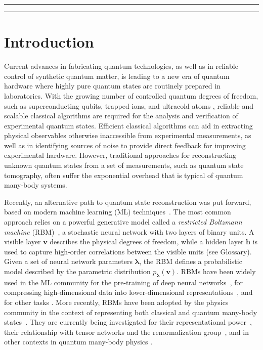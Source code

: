 \documentclass[submission, Phys, hidelnks]{SciPost}
\begin{document}
\vspace{10pt}
\noindent\rule{\textwidth}{1pt}
\tableofcontents\thispagestyle{fancy}
\noindent\rule{\textwidth}{1pt}
\vspace{10pt}

\section{Introduction}
Current advances in fabricating quantum technologies, as well as in reliable control of synthetic quantum matter, is leading to a new era of quantum 
hardware where highly pure quantum states are routinely prepared in laboratories. 
With the growing number of controlled quantum degrees of freedom, such as superconducting qubits, trapped ions, and ultracold atoms \cite{gambetta17,gambetta18,Bernien17,ion53}, reliable and scalable classical algorithms are required for the analysis and verification of experimental quantum states. 
Efficient classical algorithms can aid in extracting physical observables otherwise inaccessible from experimental measurements, as well as in identifying 
sources of noise to provide direct feedback for improving experimental hardware. However, traditional approaches for reconstructing unknown quantum states from a set of measurements, such as quantum state tomography, often suffer the exponential overhead that is typical of quantum many-body systems.

Recently, an alternative path to quantum state reconstruction was put forward, based on modern machine learning (ML) techniques~\cite{torlai_neural-network_2018,torlai_latent_2018,carrasquilla_reconstructing_2018,lennon_efficiently_2018,kim_mixed_2018}. 
The most common approach relies on a powerful generative model called a {\it restricted Boltzmann machine} (RBM)~\cite{smolensky_information_1986}, 
a stochastic neural network with two layers of binary units. 
A visible layer $\bm{v}$ describes the physical degrees of freedom, while a hidden layer $\bm{h}$ is used to capture high-order correlations between the visible units (see Glossary). 
Given a set of neural network parameters $\bm{\lambda}$, the RBM defines a probabilistic model described by the parametric distribution $p_{\bm{\lambda}}(\bm{v})$. 
RBMs have been widely used in the ML community for the pre-training of deep neural networks~\cite{hinton_training_2002}, for compressing high-dimensional data into lower-dimensional representations~\cite{hinton_reducing_2006}, and for other tasks \cite{lecun_deep_2015}.
More recently, RBMs have been adopted by the physics community in the context of representing both classical and quantum many-body states~\cite{torlai_learning_2016,CarleoTroyer2017Science,carleo_constructing_2018}.
They are currently being investigated for their representational power~\cite{gao_efficient_2017,choo_symmetries_2018,glasser_neural-network_2018}, their relationship with tensor networks and the renormalization group~\cite{mehta_exact_2014,koch-janusz_mutual_2018,iso_scale-invariant_2018,lenggenhager_optimal_2018,chen_equivalence_2018}, and in other contexts in quantum many-body physics \cite{PhysRevB.96.205152,SteveW}.
\end{document}
